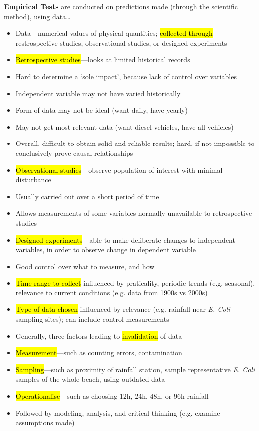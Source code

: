 \documentclass{article}
\newcommand{\headingsmall}[1]{{\small\textbf{#1}}}
\begin{document}
\begin{multicols*}{4}
\headingsmall{Empirical Tests} are conducted on predictions made (through the
scientific method), using data\dots
\begin{itemize} \itemsep -0.5em
    \item Data---numerical values of physical quantities; \hl{collected through}
         restrospective studies, observational studies, or designed experiments
    \item \hl{Retrospective studies}---looks at limited historical records
    \item Hard to determine a `sole impact', because lack of control over variables
    \item Independent variable may not have varied historically
    \item Form of data may not be ideal (want daily, have yearly)
    \item May not get most relevant data (want diesel vehicles, have all vehicles)
    \item Overall, difficult to obtain solid and reliable results; hard, if not impossible
        to conclusively prove causal relationships
    \item \hl{Observational studies}---observe population of interest with minimal 
        disturbance
    \item Usually carried out over a short period of time
    \item Allows measurements of some variables normally unavailable to retrospective studies
    \item \hl{Designed experiments}---able to make deliberate changes to independent
        variables, in order to observe change in dependent variable
    \item Good control over what to measure, and how
    \item \hl{Time range to collect} influenced by praticality, periodic trends 
        (e.g. seasonal), relevance to current conditions (e.g. data from 1900s vs 2000s)
    \item \hl{Type of data chosen} influenced by relevance (e.g. rainfall near 
        \textit{E. Coli} sampling sites); can include control measurements
    \item Generally, three factors leading to \hl{invalidation} of data
    \item \hl{Measurement}---such as counting errors, contamination
    \item \hl{Sampling}---such as proximity of rainfall station, sample representative 
        \textit{E. Coli} samples of the whole beach, using outdated data
    \item \hl{Operationalise}---such as choosing 12h, 24h, 48h, or 96h rainfall
    \item Followed by modeling, analysis, and critical thinking (e.g. examine assumptions
        made)
\end{itemize}


\end{multicols*}
\end{document}
